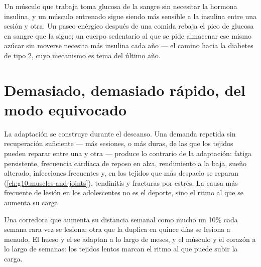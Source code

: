 \begin{example}\label{ex:g10:sport-and-health:sugar}
Un músculo que trabaja toma glucosa de la sangre sin necesitar la
hormona insulina, y un músculo entrenado sigue siendo más sensible a la
insulina entre una sesión y otra. Un paseo enérgico después de una
comida rebaja el pico de glucosa en sangre que la sigue; un cuerpo
sedentario al que se pide almacenar ese mismo azúcar sin moverse
necesita más insulina cada año --- el camino hacia la diabetes de tipo
2, cuyo mecanismo es tema del último año.
\end{example}

\section{Demasiado, demasiado rápido, del modo equivocado}

\begin{proposition}\label{prop:g10:sport-and-health:overtraining}
La adaptación se construye durante el descanso. Una demanda repetida
sin recuperación suficiente --- más sesiones, o más duras, de las que
los tejidos pueden reparar entre una y otra --- produce lo contrario de
la adaptación: fatiga persistente, frecuencia cardíaca de reposo en
alza, rendimiento a la baja, sueño alterado, infecciones frecuentes y,
en los tejidos que más despacio se reparan
(\cref{ch:g10:muscles-and-joints}), tendinitis y fracturas por estrés.
La causa más frecuente de lesión en los adolescentes no es el deporte,
sino el ritmo al que se aumenta su carga.
\end{proposition}
\admitted

\begin{example}\label{ex:g10:sport-and-health:tenpercent}
Una corredora que aumenta su distancia semanal como mucho un 10\% cada
semana rara vez se lesiona; otra que la duplica en quince días se
lesiona a menudo. El hueso y el  se adaptan a lo largo de meses,
y el músculo y el corazón a lo largo de semanas: los tejidos lentos
marcan el ritmo al que puede subir la carga.
\end{example}

